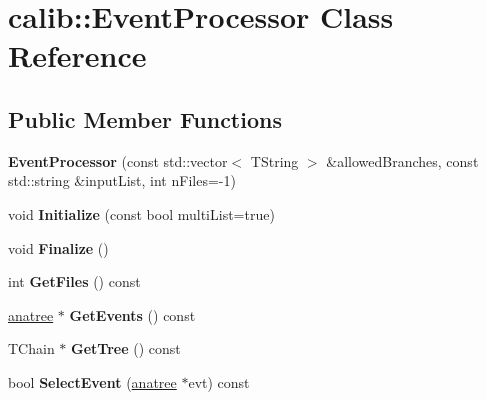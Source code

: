\hypertarget{classcalib_1_1EventProcessor}{\section{calib\-:\-:Event\-Processor Class Reference}
\label{classcalib_1_1EventProcessor}
}
\subsection*{Public Member Functions}
\begin{DoxyCompactItemize}
\item 
\hypertarget{classcalib_1_1EventProcessor_a98752ed4b110e0bc602bc9cf90671abe}{{\bfseries Event\-Processor} (const std\-::vector$<$ T\-String $>$ \&allowed\-Branches, const std\-::string \&input\-List, int n\-Files=-\/1)}\label{classcalib_1_1EventProcessor_a98752ed4b110e0bc602bc9cf90671abe}

\item 
\hypertarget{classcalib_1_1EventProcessor_abf70002d5305768445ccb726b569b62d}{void {\bfseries Initialize} (const bool multi\-List=true)}\label{classcalib_1_1EventProcessor_abf70002d5305768445ccb726b569b62d}

\item 
\hypertarget{classcalib_1_1EventProcessor_a15c2dd37ce2fa3ad037b08d1fce64de8}{void {\bfseries Finalize} ()}\label{classcalib_1_1EventProcessor_a15c2dd37ce2fa3ad037b08d1fce64de8}

\item 
\hypertarget{classcalib_1_1EventProcessor_a23237a4b66c1c16ff31daa9a035700ae}{int {\bfseries Get\-Files} () const }\label{classcalib_1_1EventProcessor_a23237a4b66c1c16ff31daa9a035700ae}

\item 
\hypertarget{classcalib_1_1EventProcessor_ab2676a33c42efae39b0ced9c418f9c2e}{\hyperlink{classanatree}{anatree} $\ast$ {\bfseries Get\-Events} () const }\label{classcalib_1_1EventProcessor_ab2676a33c42efae39b0ced9c418f9c2e}

\item 
\hypertarget{classcalib_1_1EventProcessor_a5f40e3cf46beb88dd66322dd3a49fe61}{T\-Chain $\ast$ {\bfseries Get\-Tree} () const }\label{classcalib_1_1EventProcessor_a5f40e3cf46beb88dd66322dd3a49fe61}

\item 
\hypertarget{classcalib_1_1EventProcessor_a9a905d11dcfe30aa417921d38f74bb55}{bool {\bfseries Select\-Event} (\hyperlink{classanatree}{anatree} $\ast$evt) const }\label{classcalib_1_1EventProcessor_a9a905d11dcfe30aa417921d38f74bb55}


\end{DoxyCompactItemize}
